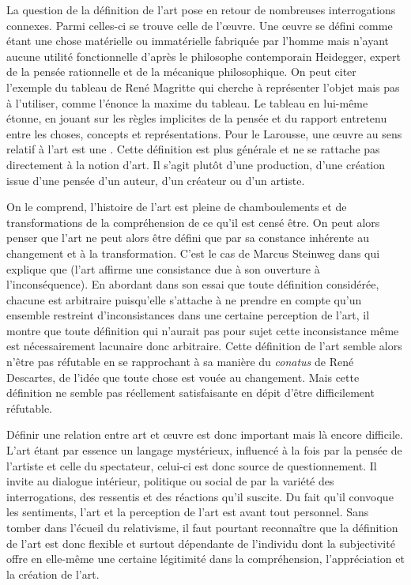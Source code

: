 \documentclass[12pt]{article} %
\begin{document}
La question de la définition de l'art pose en retour de nombreuses interrogations connexes. Parmi celles-ci se trouve celle de l'œuvre. Une œuvre se défini comme étant une chose matérielle ou immatérielle fabriquée par l'homme mais n'ayant aucune utilité fonctionnelle d'après le philosophe contemporain Heidegger, expert de la pensée rationnelle et de la mécanique philosophique. On peut citer l'exemple du tableau de René Magritte  qui cherche à représenter l'objet mais pas à l'utiliser, comme l'énonce la maxime  du tableau\cite{RMAgritte1929}. Le tableau en lui-même étonne, en jouant sur les règles implicites de la pensée et du rapport entretenu entre les choses, concepts et représentations. Pour le Larousse, une œuvre au sens relatif à l'art est une  \cite{LarousseOnline-oeuvre}. Cette définition est plus générale et ne se rattache pas directement à la notion d'art. Il s'agit plutôt d'une production, d'une création issue d'une pensée d'un auteur, d'un créateur ou d'un artiste.  

On le comprend, l'histoire de l'art est pleine de chamboulements et de transformations de la compréhension de ce qu'il est censé être. On peut alors penser que l'art ne peut alors être défini que par sa constance inhérente au changement et à la transformation. C'est le cas de Marcus Steinweg dans  qui explique que  (l'art affirme une consistance due à son ouverture à l'inconséquence). En abordant dans son essai que toute définition considérée, chacune est arbitraire puisqu'elle s'attache à ne prendre en compte qu'un ensemble restreint d'inconsistances dans une certaine perception de l'art, il montre que toute définition qui n'aurait pas pour sujet cette inconsistance même est nécessairement lacunaire donc arbitraire. Cette définition de l'art semble alors n'être pas réfutable en se rapprochant à sa manière du \textit{conatus} de René Descartes, de l'idée que toute chose est vouée au changement. Mais cette définition ne semble pas  réellement satisfaisante en dépit d'être difficilement réfutable.

Définir une relation entre art et œuvre est donc important mais là encore difficile.  L'art étant par essence un langage mystérieux, influencé à la fois par la pensée de l'artiste et celle du spectateur, celui-ci est donc source de questionnement. Il invite au dialogue intérieur, politique ou social de par la variété des interrogations, des ressentis et des réactions qu'il suscite. Du fait qu'il convoque les sentiments, l'art et la perception de l'art est avant tout personnel. Sans tomber dans l'écueil du relativisme, il faut pourtant reconnaître que la définition de l'art est donc flexible et surtout dépendante de l'individu dont la subjectivité offre en elle-même une certaine légitimité dans la compréhension, l'appréciation et la création de l'art. 
\end{document}
